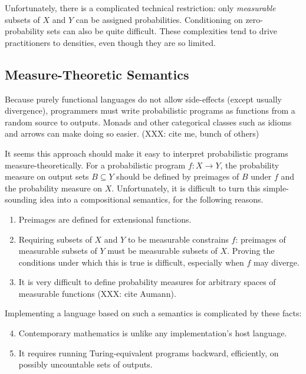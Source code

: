 \documentclass[preprint]{sigplanconf}
\begin{document}
Unfortunately, there is a complicated technical restriction: only \emph{measurable} subsets of $X$ and $Y$ can be assigned probabilities.
Conditioning on zero-probability sets can also be quite difficult.
These complexities tend to drive practitioners to densities, even though they are so limited.

\subsection{Measure-Theoretic Semantics}

Because purely functional languages do not allow side-effects (except usually divergence), programmers must write probabilistic programs as functions from a random source to outputs.
Monads and other categorical classes such as idioms and arrows can make doing so easier. (XXX: cite me, bunch of others)

It seems this approach should make it easy to interpret probabilistic programs measure-theoretically.
For a probabilistic program $f : X \to Y$, the probability measure on output sets $B \subseteq Y$ should be defined by preimages of $B$ under $f$ and the probability measure on $X$.
Unfortunately, it is difficult to turn this simple-sounding idea into a compositional semantics, for the following reasons.
\begin{enumerate}
	\item Preimages are defined for extensional functions. \label{problem:observable-domain}
	\item Requiring subsets of $X$ and $Y$ to be measurable constrains $f$: preimages of measurable subsets of $Y$ must be measurable subsets of $X$. Proving the conditions under which this is true is difficult, especially when $f$ may diverge. \label{problem:measurability}
	\item It is very difficult to define probability measures for arbitrary spaces of measurable functions (XXX: cite Aumann). \label{problem:higher-orderness}
\end{enumerate}
Implementing a language based on such a semantics is complicated by these facts:
\begin{enumerate}
	\setcounter{enumi}{3}
	\item Contemporary mathematics is unlike any implementation's host language. \label{problem:different-language}
	\item It requires running Turing-equivalent programs backward, efficiently, on possibly uncountable sets of outputs.\label{problem:backward-efficient}
\end{enumerate}
\end{document}
